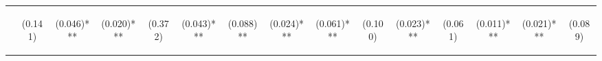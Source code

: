 \begin{center}
\begin{tabular}{lcccccccccccccc}
\hline  & \begin{normalsize}(0.141)\end{normalsize} & \begin{normalsize}(0.046)***\end{normalsize} & \begin{normalsize}(0.020)***\end{normalsize} & \begin{normalsize}(0.372)\end{normalsize} & \begin{normalsize}(0.043)***\end{normalsize} & \begin{normalsize}(0.088)**\end{normalsize} & \begin{normalsize}(0.024)***\end{normalsize} & \begin{normalsize}(0.061)***\end{normalsize} & \begin{normalsize}(0.100)\end{normalsize} & \begin{normalsize}(0.023)***\end{normalsize} & \begin{normalsize}(0.061)\end{normalsize} & \begin{normalsize}(0.011)***\end{normalsize} & \begin{normalsize}(0.021)***\end{normalsize} & \begin{normalsize}(0.089)\end{normalsize}\\

\end{tabular}
\end{center}
